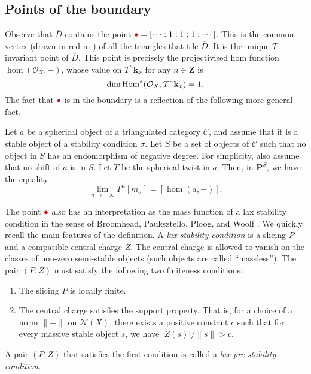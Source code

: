 \documentclass{amsart}
\begin{document}
\subsection{Points of the boundary}\label{sec:boundary}
Observe that \(\overline D\) contains the point \(\textcolor{red}{\bullet} = [\cdots :1:1:1: \cdots]\).
This is the common vertex (drawn in red in ) of all the triangles that tile \(\overline D\).
It is the unique \(T\)-invariant point of \(\overline D\).
This point is precisely the projectivised hom function \(\hom(\mathcal{O}_X,-)\), whose value on \(T^n \mathbf{k}_x\) for any \(n \in \mathbf{Z}\) is
\[ \dim \operatorname{Hom}^{*}(\mathcal{O}_{X}, T^n\mathbf{k}_x) = 1.\]
The fact that \(\textcolor{red}{\bullet}\) is in the boundary is a reflection of the following more general fact.
\begin{theorem}
  \label{thm:qhom}
  Let \(a\) be a spherical object of a triangulated category \(\mathcal{C}\), and assume that it is a stable object of a stability condition \(\sigma\).
  Let \(S\) be a set of objects of \(\mathcal{C}\) such that no object in \(S\) has an endomorphism of negative degree.
  For simplicity, also assume that no shift of \(a\) is in \(S\).
  Let \(T\) be the spherical twist in \(a\).
  Then, in \(\mathbf{P}^S\), we have the equality
  \[\lim_{n \to \pm \infty} T^n[m_{\sigma}] = [ \hom(a,-)].\]
\end{theorem}

The point \(\textcolor{red}{\bullet}\) also has an interpretation as the mass function of a lax stability condition in the sense of Broomhead, Pauksztello, Ploog, and Woolf \cite{bro.pau.plo.ea:22}.
We quickly recall the main features of the definition.
A \emph{lax stability condition} is a slicing \(P\) and a compatible central charge \(Z\).
The central charge is allowed to vanish on the classes of non-zero semi-stable objects (such objects are called ``massless'').
The pair \((P,Z)\) must satisfy the following two finiteness conditions:
\begin{enumerate}
\item The slicing \(P\) is locally finite.
\item The central charge satisfies the support property.
  That is, for a choice of a norm \(\|-\|\) on \(\mathcal{N}(X)\), there exists a positive constant \(c\) such that for every massive stable object \(s\), we have \(|Z(s)|/\|s\| > c\).
\end{enumerate}
A pair \((P,Z)\) that satisfies the first condition is called a \emph{lax pre-stability condition}.
\end{document}
